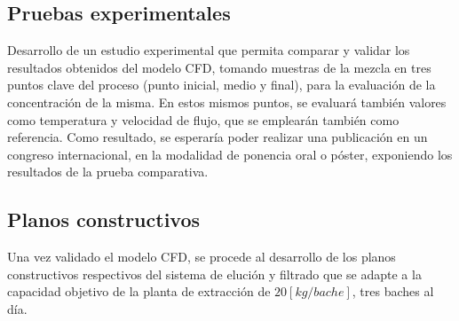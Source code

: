 \subsection{Pruebas experimentales}

\noindent
\justify

Desarrollo de un estudio experimental que permita comparar y validar los resultados obtenidos del modelo CFD, tomando muestras de la mezcla en tres puntos clave del proceso (punto inicial, medio y final), para la evaluaci\'on de la concentraci\'on de la misma. En estos mismos puntos, se evaluar\'a tambi\'en valores como temperatura y velocidad de flujo, que se emplear\'an tambi\'en como referencia. Como resultado, se esperar\'ia poder realizar una publicaci\'on en un congreso internacional, en la modalidad de ponencia oral o p\'oster, exponiendo los resultados de la prueba comparativa. 

\subsection{Planos constructivos}

\noindent
\justify

Una vez validado el modelo CFD, se procede al desarrollo de los planos constructivos respectivos del sistema de eluci\'on y filtrado que se adapte a la capacidad objetivo de la planta de extracci\'on de $20 \left[kg / bache \right]$, tres baches al d\'ia.
